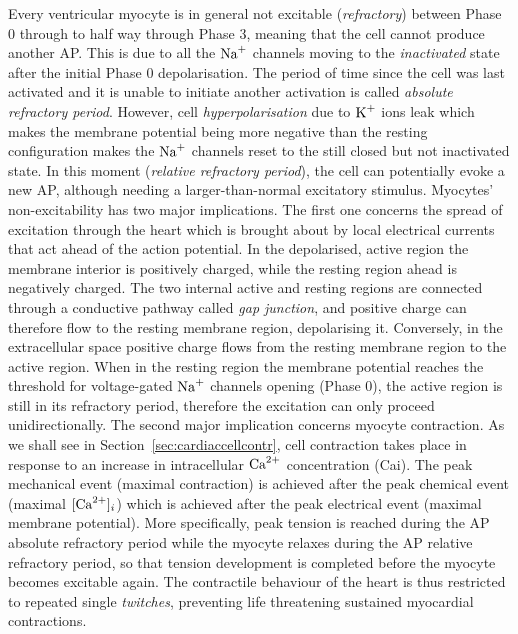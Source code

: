 \vspace{0.2cm}
Every ventricular myocyte is in general not excitable (\textit{refractory}) between Phase $0$ through to half way through Phase $3$, meaning that the cell cannot produce another AP. This is due to all the $\textrm{Na}^{+}$ channels moving to the \textit{inactivated} state after the initial Phase $0$ depolarisation. The period of time since the cell was last activated and it is unable to initiate another activation is called \textit{absolute refractory period}. However, cell \textit{hyperpolarisation} due to $\textrm{K}^{+}$ ions leak which makes the membrane potential being more negative than the resting configuration makes the $\textrm{Na}^{+}$ channels reset to the still closed but not inactivated state. In this moment (\textit{relative refractory period}), the cell can potentially evoke a new AP, although needing a larger-than-normal excitatory stimulus. Myocytes' non-excitability has two major implications. The first one concerns the spread of excitation through the heart which is brought about by local electrical currents that act ahead of the action potential. In the depolarised, active region the membrane interior is positively charged, while the resting region ahead is negatively charged. The two internal active and resting regions are connected through a conductive pathway called \textit{gap junction}, and positive charge can therefore flow to the resting membrane region, depolarising it. Conversely, in the extracellular space positive charge flows from the resting membrane region to the active region. When in the resting region the membrane potential reaches the threshold for voltage-gated $\textrm{Na}^{+}$ channels opening (Phase $0$), the active region is still in its refractory period, therefore the excitation can only proceed unidirectionally. The second major implication concerns myocyte contraction. As we shall see in Section~\ref{sec:cardiaccellcontr}, cell contraction takes place in response to an increase in intracellular $\textrm{Ca}^{2+}$ concentration (\acs{Cai}). The peak mechanical event (maximal contraction) is achieved after the peak chemical event (maximal $[\textrm{Ca}^{2+}]_{i}$) which is achieved after the peak electrical event (maximal membrane potential). More specifically, peak tension is reached during the AP absolute refractory period while the myocyte relaxes during the AP relative refractory period, so that tension development is completed before the myocyte becomes excitable again. The contractile behaviour of the heart is thus restricted to repeated single \textit{twitches}, preventing life threatening sustained myocardial contractions.

